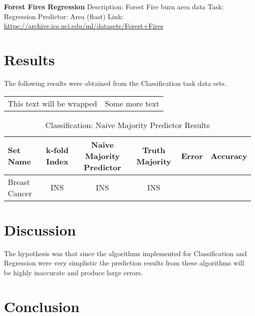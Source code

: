 \documentclass[twoside,11pt]{article}
\begin{document}
{\noindent}\textbf{Forest Fires Regression}\newline
Description: Forest Fire burn area data\newline
Task: Regression\newline
Predictor: Area (float)\newline
Link: \newline
\url{https://archive.ics.uci.edu/ml/datasets/Forest+Fires}\newline
	
\newpage

\section{Results}
The following results were obtained from the Classification task data sets.\newline


\begin{tabular}{|p{1cm}|p{3cm}|}
	This text will be wrapped & Some more text \\
\end{tabular}

\begin{table}[h!]
	\begin{center}
		\caption{Classification: Naive Majority Predictor Results}
		\label{tab:table1}
		\begin{tabular}{l|c|c|c|c|c} 
			\textbf{Set Name} & 
			\textbf{\textbf{k}-fold Index} & 
			\textbf{Naive Majority Predictor} & 
			\textbf{Truth Majority} &
			\textbf{Error} &
			\textbf{Accuracy}\\
			\hline
			Breast Cancer & 
			INS & 
			INS &
			INS &  

		\end{tabular}
	\end{center}
\end{table}

\newpage

\section{Discussion}
The hypothesis was that since the algorithms implemented for Classification and Regression were very simplistic the prediction results from these algorithms will be highly inaccurate and produce large errors.

\newpage

\section{Conclusion}

\newpage



\vskip 0.2in

\end{document}
